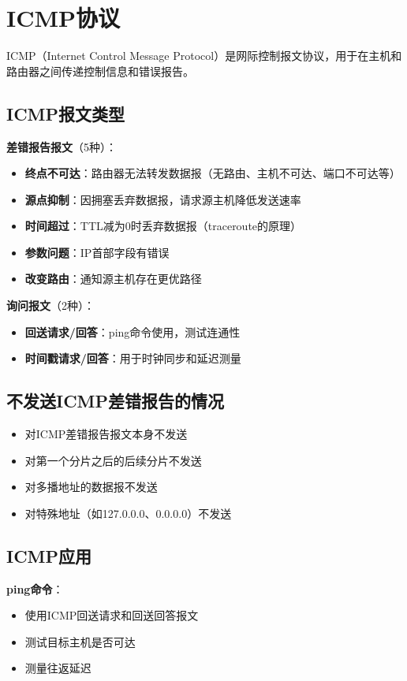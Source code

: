 \documentclass[12pt,a4paper,openany]{ctexbook}
\begin{document}
\section{ICMP协议}
ICMP（Internet Control Message Protocol）是网际控制报文协议，用于在主机和路由器之间传递控制信息和错误报告。

\subsection{ICMP报文类型}
\textbf{差错报告报文}（5种）：
\begin{itemize}[leftmargin=2em,itemsep=0pt]
    \item \textbf{终点不可达}：路由器无法转发数据报（无路由、主机不可达、端口不可达等）
    \item \textbf{源点抑制}：因拥塞丢弃数据报，请求源主机降低发送速率
    \item \textbf{时间超过}：TTL减为0时丢弃数据报（traceroute的原理）
    \item \textbf{参数问题}：IP首部字段有错误
    \item \textbf{改变路由}：通知源主机存在更优路径
\end{itemize}

\textbf{询问报文}（2种）：
\begin{itemize}[leftmargin=2em,itemsep=0pt]
    \item \textbf{回送请求/回答}：ping命令使用，测试连通性
    \item \textbf{时间戳请求/回答}：用于时钟同步和延迟测量
\end{itemize}

\subsection{不发送ICMP差错报告的情况}
\begin{itemize}[leftmargin=2em,itemsep=0pt]
    \item 对ICMP差错报告报文本身不发送
    \item 对第一个分片之后的后续分片不发送
    \item 对多播地址的数据报不发送
    \item 对特殊地址（如127.0.0.0、0.0.0.0）不发送
\end{itemize}

\subsection{ICMP应用}
\textbf{ping命令}：
\begin{itemize}[leftmargin=2em,itemsep=0pt]
    \item 使用ICMP回送请求和回送回答报文
    \item 测试目标主机是否可达
    \item 测量往返延迟
\end{itemize}
\end{document}

